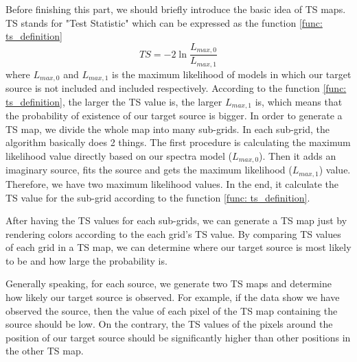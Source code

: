\documentclass[12pt]{report}
\begin{document}
          Before finishing this part, we should briefly introduce the basic idea of TS maps. 
          TS stands for "Test Statistic" which can be expressed as the function \ref{func: ts_definition}
          \begin{equation}
            TS = -2 \ln{\frac{L_{max,0}}{L_{max,1}}}
            \label{func: ts_definition}
          \end{equation}
          where $L_{max,0}$ and $L_{max,1}$ is the maximum likelihood of models in which our 
          target source is not included and included respectively. According to the function 
          \ref{func: ts_definition}, the larger the TS value is, the larger $L_{max, 1}$ is, which
          means that the probability of existence of our target source is bigger. 
          In order to generate a TS map, we divide the whole map into many sub-grids. In each sub-grid,
          the algorithm basically does 2 things. The first procedure is calculating the maximum likelihood value
          directly based on our spectra model ($L_{max,0}$). Then it adds an imaginary source, fits the source 
          and gets the maximum likelihood ($L_{max, 1}$) value. Therefore, we have two maximum likelihood values.
          In the end, it calculate the TS value for the 
          sub-grid according to the function \ref{func: ts_definition}. 

          After having the TS values for each sub-grids, we can generate a TS map just by 
          rendering colors according to the each grid's TS value. By comparing TS values of 
          each grid in a TS map, we can 
          determine where our target source is most likely to be and how large the probability is. 
          
          Generally speaking, for each source, we generate two TS maps and determine how likely our target source
          is observed. For example, if the data show we have observed the source, then the value of each pixel
          of the TS map containing the source should be low. On the contrary, the TS values of the pixels around 
          the position of our target source should be significantly higher than other positions in the other TS map.
          
          
\end{document}
